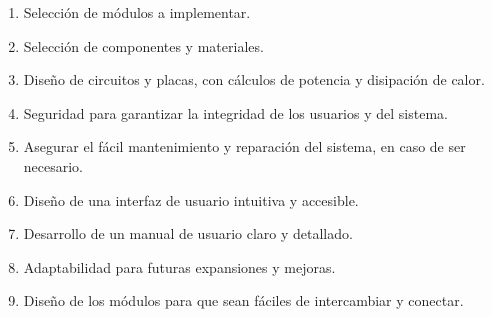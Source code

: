 \begin{enumerate}[noitemsep]
    \item Selección de módulos a implementar.
    \item Selección de componentes y materiales.
    \item Diseño de circuitos y placas, con cálculos de potencia y disipación de calor.
    \item Seguridad para garantizar la integridad de los usuarios y del sistema.
    \item Asegurar el fácil mantenimiento y reparación del sistema, en caso de ser necesario.
    \item Diseño de una interfaz de usuario intuitiva y accesible.
    \item Desarrollo de un manual de usuario claro y detallado.
    \item Adaptabilidad para futuras expansiones y mejoras.
    \item Diseño de los módulos para que sean fáciles de intercambiar y conectar.
\end{enumerate}